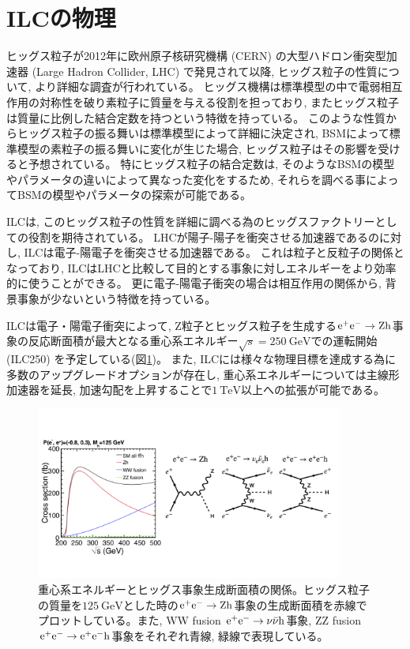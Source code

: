 \section{ILCの物理} \label{Intro:PhysicsofILC}

ヒッグス粒子が2012年に欧州原子核研究機構 (CERN) の大型ハドロン衝突型加速器 (Large Hadron Collider, LHC) で発見されて以降, ヒッグス粒子の性質について, より詳細な調査が行われている。
ヒッグス機構は標準模型の中で電弱相互作用の対称性を破り素粒子に質量を与える役割を担っており, またヒッグス粒子は質量に比例した結合定数を持つという特徴を持っている。
このような性質からヒッグス粒子の振る舞いは標準模型によって詳細に決定され, BSMによって標準模型の素粒子の振る舞いに変化が生じた場合, ヒッグス粒子はその影響を受けると予想されている。
特にヒッグス粒子の結合定数は, そのようなBSMの模型やパラメータの違いによって異なった変化をするため, それらを調べる事によってBSMの模型やパラメータの探索が可能である。

ILCは, このヒッグス粒子の性質を詳細に調べる為のヒッグスファクトリーとしての役割を期待されている。
LHCが陽子-陽子を衝突させる加速器であるのに対し, ILCは電子-陽電子を衝突させる加速器である。
これは粒子と反粒子の関係となっており, ILCはLHCと比較して目的とする事象に対しエネルギーをより効率的に使うことができる。
更に電子-陽電子衝突の場合は相互作用の関係から, 背景事象が少ないという特徴を持っている。

ILCは電子・陽電子衝突によって, Z粒子とヒッグス粒子を生成する$\rm e^+e^- \to Zh$事象の反応断面積が最大となる重心系エネルギー$\sqrt{s}=250\ \mathrm{GeV}$での運転開始 (ILC250) を予定している(図\ref{4eetoZH})。
また, ILCには様々な物理目標を達成する為に多数のアップグレードオプションが存在し, 重心系エネルギーについては主線形加速器を延長, 加速勾配を上昇することで$1\ \mathrm{TeV}$以上への拡張が可能である。

\begin{figure}[htbp]
 \centering
 \includegraphics[trim= 0 50 0 50, width=0.9\textwidth, clip]{Figure/1Introduction/4eetoZH.png}
 \caption[重心系エネルギーとヒッグス事象生成断面積の関係]{重心系エネルギーとヒッグス事象生成断面積の関係\cite{ILCTDRVP}。ヒッグス粒子の質量を$125\ \mathrm{GeV}$とした時の$\rm e^+e^- \to Zh$事象の生成断面積を赤線でプロットしている。また, WW fusion $\rm e^+e^- \to \nu \bar{\nu} h$事象, ZZ fusion $\rm e^+e^- \to e^+ e^- h$事象をそれぞれ青線, 緑線で表現している。}
 \label{4eetoZH}
\end{figure}

